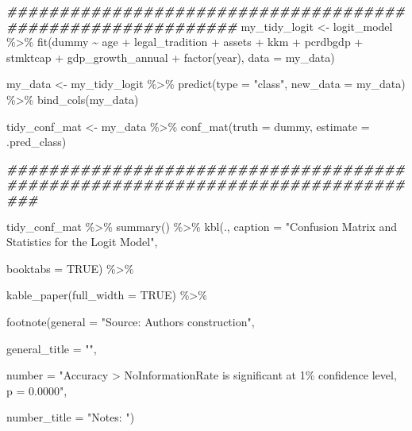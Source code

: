 \documentclass[a4paper,nobind]{templates/ociamthesis}
\newenvironment{Shaded}{\begin{snugshade}}{\end{snugshade}}
\newcommand{\AttributeTok}[1]{\textcolor[rgb]{0.77,0.63,0.00}{#1}}
\newcommand{\ConstantTok}[1]{\textcolor[rgb]{0.00,0.00,0.00}{#1}}
\newcommand{\DocumentationTok}[1]{\textcolor[rgb]{0.56,0.35,0.01}{\textbf{\textit{#1}}}}
\newcommand{\FunctionTok}[1]{\textcolor[rgb]{0.00,0.00,0.00}{#1}}
\newcommand{\NormalTok}[1]{#1}
\newcommand{\OtherTok}[1]{\textcolor[rgb]{0.56,0.35,0.01}{#1}}
\newcommand{\SpecialCharTok}[1]{\textcolor[rgb]{0.00,0.00,0.00}{#1}}
\newcommand{\StringTok}[1]{\textcolor[rgb]{0.31,0.60,0.02}{#1}}
\renewenvironment{Shaded}
{
  \vspace{10pt}%
  \begin{snugshade}%
}{%
  \end{snugshade}%
  \vspace{8pt}%
}
\begin{document}
\begin{Shaded}
\begin{Highlighting}[]
\DocumentationTok{\#\#\#\#\#\#\#\#\#\#\#\#\#\#\#\#\#\#\#\#\#\#\#\#\#\#\#\#\#\#\#\#\#\#\#\#\#\#\#\#\#\#\#\#\#\#\#\#\#\#\#\#\#\#\#\#\#\#\#\#}
\NormalTok{my\_tidy\_logit }\OtherTok{\textless{}{-}}\NormalTok{ logit\_model }\SpecialCharTok{\%\textgreater{}\%} \FunctionTok{fit}\NormalTok{(dummy }\SpecialCharTok{\textasciitilde{}}\NormalTok{ age }\SpecialCharTok{+}\NormalTok{ legal\_tradition }\SpecialCharTok{+} 
\NormalTok{       assets }\SpecialCharTok{+}\NormalTok{ kkm }\SpecialCharTok{+}\NormalTok{ pcrdbgdp }\SpecialCharTok{+}\NormalTok{ stmktcap }\SpecialCharTok{+}\NormalTok{ gdp\_growth\_annual }\SpecialCharTok{+} \FunctionTok{factor}\NormalTok{(year), }
       \AttributeTok{data =}\NormalTok{ my\_data)}

\NormalTok{my\_data }\OtherTok{\textless{}{-}}\NormalTok{ my\_tidy\_logit }\SpecialCharTok{\%\textgreater{}\%} \FunctionTok{predict}\NormalTok{(}\AttributeTok{type =} \StringTok{"class"}\NormalTok{, }\AttributeTok{new\_data =}\NormalTok{ my\_data) }\SpecialCharTok{\%\textgreater{}\%} \FunctionTok{bind\_cols}\NormalTok{(my\_data)}

\NormalTok{tidy\_conf\_mat }\OtherTok{\textless{}{-}}\NormalTok{ my\_data }\SpecialCharTok{\%\textgreater{}\%} \FunctionTok{conf\_mat}\NormalTok{(}\AttributeTok{truth =}\NormalTok{ dummy, }\AttributeTok{estimate =}\NormalTok{ .pred\_class)}

\DocumentationTok{\#\#\#\#\#\#\#\#\#\#\#\#\#\#\#\#\#\#\#\#\#\#\#\#\#\#\#\#\#\#\#\#\#\#\#\#\#\#\#\#\#\#\#\#\#\#\#\#\#\#\#\#\#\#\#\#\#\#\#\#\#\#\#\#\#\#\#\#\#\#\#\#\#\#\#\#\#\#\#}

\NormalTok{tidy\_conf\_mat }\SpecialCharTok{\%\textgreater{}\%} \FunctionTok{summary}\NormalTok{() }\SpecialCharTok{\%\textgreater{}\%} \FunctionTok{kbl}\NormalTok{(., }\AttributeTok{caption =} \StringTok{"Confusion Matrix and Statistics for the Logit Model"}\NormalTok{, }
      
      \AttributeTok{booktabs =} \ConstantTok{TRUE}\NormalTok{) }\SpecialCharTok{\%\textgreater{}\%} 
  
  \FunctionTok{kable\_paper}\NormalTok{(}\AttributeTok{full\_width =} \ConstantTok{TRUE}\NormalTok{) }\SpecialCharTok{\%\textgreater{}\%} 
  
  \FunctionTok{footnote}\NormalTok{(}\AttributeTok{general =} \StringTok{"Source: Authors\textquotesingle{} construction"}\NormalTok{,}
           
           \AttributeTok{general\_title =} \StringTok{""}\NormalTok{, }
           
           \AttributeTok{number =} \StringTok{"Accuracy \textgreater{} NoInformationRate is significant at 1\% confidence level, p = 0.0000"}\NormalTok{,}
  
  \AttributeTok{number\_title =} \StringTok{"Notes: "}\NormalTok{)}
\end{Highlighting}
\end{Shaded}
\end{document}
